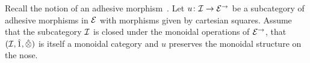 \documentclass[reqno,10pt,a4paper,oneside]{amsart}
\begin{document}
\medskip


Recall the notion of an adhesive morphism~\cite{garner-lack:adhesive}.  Let $u \co \cal{I} \to \catE^{\to}$ be a subcategory of adhesive morphisms in $\catE$ with morphisms given by cartesian squares. Assume that the subcategory $\cal{I}$ is closed under the monoidal operations of $\catE^{\to}$, \ie that $(\cal{I}, \hatunit, \hatotimes)$ is itself a monoidal category and $u$ preserves the monoidal structure on the nose. 

\newpage











\end{document}
